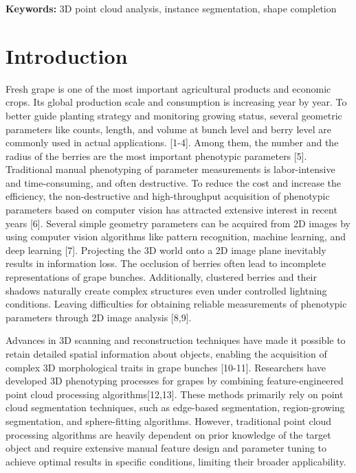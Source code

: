 \documentclass[12pt]{article}
\begin{document}
\textbf{Keywords:} 3D point cloud analysis, instance segmentation, shape completion

\doublespacing

\section{Introduction}
Fresh grape is one of the most important agricultural products and economic crops. 
Its global production scale and consumption is increasing year by year. 
To better guide planting strategy and monitoring growing status, several geometric parameters like counts, length, and volume at bunch level and berry level are commonly used in actual applications. [1-4]. 
Among them, the number and the radius of the berries are the most important phenotypic parameters [5]. 
Traditional manual phenotyping of parameter measurements is labor-intensive and time-consuming, and often destructive. 
To reduce the cost and increase the efficiency, the non-destructive and high-throughput acquisition of phenotypic parameters based on computer vision has attracted extensive interest in recent years [6]. 
Several simple geometry parameters can be acquired from 2D images by using computer vision algorithms like pattern recognition, machine learning, and deep learning [7]. 
Projecting the 3D world onto a 2D image plane inevitably results in information loss. 
The occlusion of berries often lead to incomplete representations of grape bunches. 
Additionally, clustered berries and their shadows naturally create complex structures even under controlled lightning conditions. 
Leaving difficulties for obtaining reliable measurements of phenotypic parameters through 2D image analysis [8,9].

Advances in 3D scanning and reconstruction techniques have made it possible to retain detailed spatial information about objects, enabling the acquisition of complex 3D morphological traits in grape bunches [10-11]. 
Researchers have developed 3D phenotyping processes for grapes by combining feature-engineered point cloud processing algorithms[12,13]. 
These methods primarily rely on point cloud segmentation techniques, such as edge-based segmentation, region-growing segmentation, and sphere-fitting algorithms. 
However, traditional point cloud processing algorithms are heavily dependent on prior knowledge of the target object and require extensive manual feature design and parameter tuning to achieve optimal results in specific conditions, limiting their broader applicability.
\end{document}
